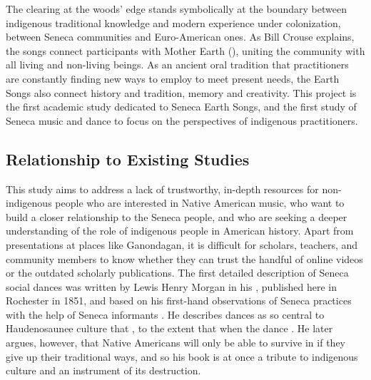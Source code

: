 \documentclass{neh}
\begin{document}
The clearing at the woods' edge stands symbolically at the boundary between
indigenous traditional knowledge and modern experience under colonization,
between Seneca communities and Euro-American ones.
As Bill Crouse explains, the songs connect participants with Mother Earth
(), uniting the community with all living and
non-living beings.
As an ancient oral tradition that practitioners are constantly finding new
ways to employ to meet present needs, the Earth Songs also connect history and
tradition, memory and creativity.
This project is the first academic study dedicated to Seneca Earth Songs, and
the first study of Seneca music and dance to focus on the perspectives of
indigenous practitioners.

\subsection{Relationship to Existing Studies}

This study aims to address a lack of trustworthy, in-depth resources for
non-indigenous people who are interested in Native American music, who want to
build a closer relationship to the Seneca people, and who are seeking a deeper
understanding of the role of indigenous people in American history.
Apart from presentations at places like Ganondagan, it is difficult for
scholars, teachers, and community members to know whether they can trust the
handful of online videos or the outdated scholarly publications.
The first detailed description of Seneca social dances was written by Lewis
Henry Morgan in his ,
published here in Rochester in 1851, and based on his first-hand observations
of Seneca practices with the help of Seneca informants
\Autocite{Morgan:League}.
He describes dances as so central to Haudenosaunee culture that , to the
extent that when the dance 
\Autocite[261, 263]{Morgan:League}.
He later argues, however, that Native Americans will only be able to survive
in  if they give up their traditional ways, and so his
book is at once a tribute to indigenous culture and an instrument of its
destruction.
\end{document}
